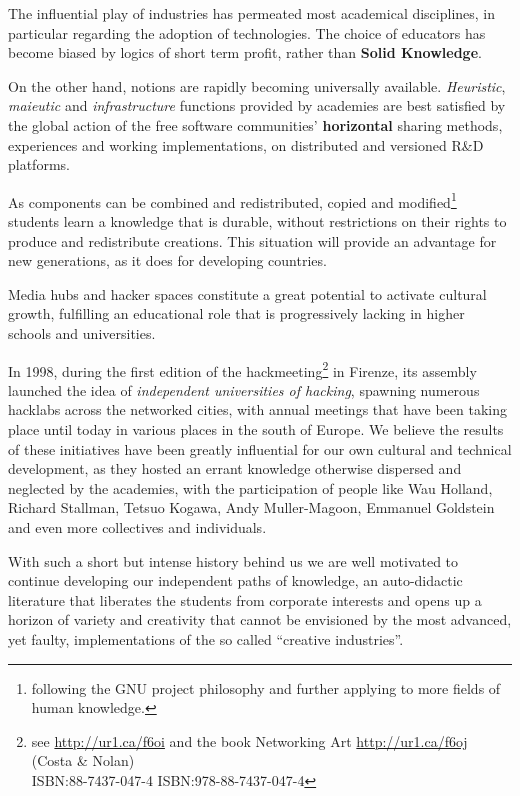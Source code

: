 The inf\hbox{}luential play of industries has permeated most academical
disciplines, in particular regarding the adoption of technologies. The choice of
educators has become biased by logics of short term prof\hbox{}it, rather than
\textbf{Solid Knowledge}.

On the other hand, notions are rapidly becoming universally available.
\textit{Heuristic}, \textit{maieutic} and \textit{infrastructure} functions
provided by academies are best satisf\hbox{}ied by the global action of the free
software communities' \textbf{horizontal} sharing methods, experiences and
working implementations, on distributed and versioned R\&D platforms.

As components can be combined and redistributed, copied and
modif\hbox{}ied\footnote{following the GNU project philosophy and further
applying to more f\hbox{}ields of human knowledge.} students learn a knowledge
that is durable, without restrictions on their rights to produce and
redistribute creations.  This situation will provide an advantage for new
generations, as it does for developing countries.

Media hubs and hacker spaces constitute a great potential to activate cultural
growth, fulf\hbox{}illing an educational role that is progressively lacking in
higher schools and universities.

In 1998, during the f\hbox{}irst edition of the hackmeeting\footnote{see
\url{http://ur1.ca/f6oi} and the book Networking Art \url{http://ur1.ca/f6oj}
(Costa \& Nolan)\\ ISBN:88-7437-047-4 ISBN:978-88-7437-047-4} in
F\hbox{}irenze, its assembly launched the idea of \textit{independent
universities of hacking}, spawning numerous hacklabs across the networked
cities, with annual meetings that have been taking place until today in various
places in the south of Europe. We believe the results of these initiatives have
been greatly inf\hbox{}luential for our own cultural and technical development,
as they hosted an errant knowledge otherwise dispersed and neglected by the
academies, with the participation of people like Wau Holland, Richard Stallman,
Tetsuo Kogawa, Andy Muller-Magoon, Emmanuel Goldstein and even more collectives
and individuals.

With such a short but intense history behind us we are well motivated to
continue developing our independent paths of knowledge, an auto-didactic
literature that liberates the students from corporate interests and opens up a
horizon of variety and creativity that cannot be envisioned by the most
advanced, yet faulty, implementations of the so called ``creative industries''.


